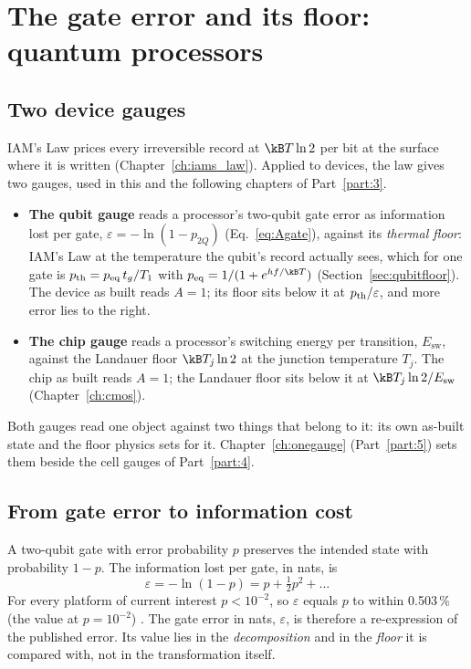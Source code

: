 \chapter{The gate error and its floor: quantum processors}\label{ch:ascoreqc}

\section{Two device gauges}\label{sec:devicegauges}

IAM's Law prices every irreversible record at $\kB T\ln2$ per bit at the surface where it is written (Chapter~\ref{ch:iams_law}). Applied to devices,
the law gives two gauges, used in this and the following chapters of Part~\ref{part:3}.
\begin{itemize}
\item \textbf{The qubit gauge} reads a processor's two-qubit gate error as information lost per gate, $\varepsilon=-\ln(1-p_{2Q})$
(Eq.~\eqref{eq:Agate}), against its \emph{thermal floor}: IAM's Law at the temperature the qubit's record actually sees, which for one gate
is $p_{\rm th}=p_{\rm eq}\,t_g/T_1$ with $p_{\rm eq}=1/(1+e^{hf/\kB T})$ (Section~\ref{sec:qubitfloor}). The device as built reads $A=1$; its
floor sits below it at $p_{\rm th}/\varepsilon$, and more error lies to the right.
\item \textbf{The chip gauge} reads a processor's switching energy per transition, $E_{\mathrm{sw}}$, against the Landauer floor
$\kB T_j\ln2$ at the junction temperature $T_j$. The chip as built reads $A=1$; the Landauer floor sits below it at $\kB T_j\ln2/E_{\mathrm{sw}}$
(Chapter~\ref{ch:cmos}).
\end{itemize}
Both gauges read one object against two things that belong to it: its own as-built state and the floor physics sets for it. Chapter~\ref{ch:onegauge}
(Part~\ref{part:5}) sets them beside the cell gauges of Part~\ref{part:4}.

\section{From gate error to information cost}

A two-qubit gate with error probability $p$ preserves the intended state with probability
$1-p$. The information lost per gate, in nats, is
\begin{equation}
 \varepsilon=-\ln(1-p)=p+\tfrac12p^2+\dots
 \label{eq:Agate}
\end{equation}
For every platform of current interest $p<10^{-2}$, so $\varepsilon$ equals $p$ to within
0.503\,\% (the value at $p=10^{-2}$) \calc. The gate error in nats, $\varepsilon$, is therefore a re-expression of the published error. Its value lies in the
\emph{decomposition} and in the \emph{floor} it is compared with, not in the transformation itself.

